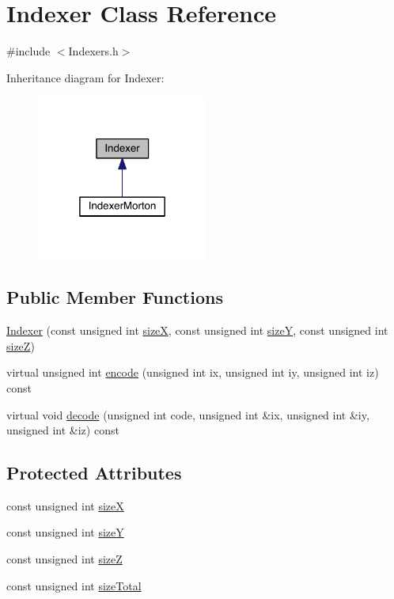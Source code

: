 \hypertarget{class_indexer}{}\section{Indexer Class Reference}
\label{class_indexer}


{\ttfamily \#include $<$Indexers.\+h$>$}



Inheritance diagram for Indexer\+:\nopagebreak
\begin{figure}[H]
\begin{center}
\leavevmode
\includegraphics[width=160pt]{d7/d28/class_indexer__inherit__graph}
\end{center}
\end{figure}
\subsection*{Public Member Functions}
\begin{DoxyCompactItemize}
\item 
\hyperlink{class_indexer_a5970ece298765928cb7fff37f479f0c5}{Indexer} (const unsigned int \hyperlink{class_indexer_a676432f4a3f9853c4b32b0661abeab4b}{size\+X}, const unsigned int \hyperlink{class_indexer_a63c52b7b6c393faaea438666b722f514}{size\+Y}, const unsigned int \hyperlink{class_indexer_a054ea5515e47670dd528c1520c2fa698}{size\+Z})
\item 
virtual unsigned int \hyperlink{class_indexer_a989c05a88fd75f782091925d3b043453}{encode} (unsigned int ix, unsigned int iy, unsigned int iz) const 
\item 
virtual void \hyperlink{class_indexer_a25518049d34df74617ca795b5f7efcdf}{decode} (unsigned int code, unsigned int \&ix, unsigned int \&iy, unsigned int \&iz) const 
\end{DoxyCompactItemize}
\subsection*{Protected Attributes}
\begin{DoxyCompactItemize}
\item 
const unsigned int \hyperlink{class_indexer_a676432f4a3f9853c4b32b0661abeab4b}{size\+X}
\item 
const unsigned int \hyperlink{class_indexer_a63c52b7b6c393faaea438666b722f514}{size\+Y}
\item 
const unsigned int \hyperlink{class_indexer_a054ea5515e47670dd528c1520c2fa698}{size\+Z}
\item 
const unsigned int \hyperlink{class_indexer_a502d6da55d821465c7e050cdbc873a97}{size\+Total}
\end{DoxyCompactItemize}


